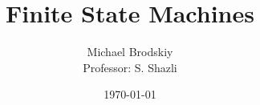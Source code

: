 


\pagestyle{fancy}

\title{Finite State Machines}
\date{\today}
\author{Michael Brodskiy\\ \small Professor: S. Shazli}



\maketitle

\thispagestyle{fancy}

\newpage

